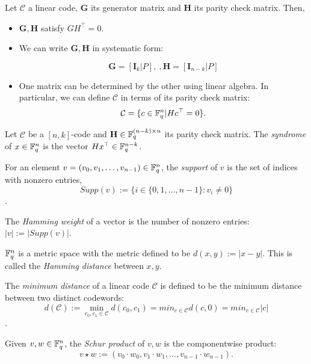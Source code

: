 \begin{remark}
Let $\mathcal{C}$ a linear code, $\mathbf{G}$ its generator matrix and $\mathbf{H}$ its parity check matrix. Then,

\begin{itemize}
\item $\mathbf{G},\mathbf{H}$ satisfy $GH^\top = 0$.
\item We can write $\mathbf{G},\mathbf{H}$ in systematic form:

\[
\mathbf{G} = [ \mathbf{I}_k | P] , \ , \mathbf{H} = [ \mathbf{I}_{n-k} | P]
\]

\item One matrix can be determined by the other using linear algebra. In particular, we can define $\mathcal{C}$ in terms of its parity check matrix: \[\mathcal{C} = \{c \in \mathbb{F}_q^n | Hc^\top = 0 \}.\]
\end{itemize}
\end{remark}

\begin{defn}
Let $\mathcal{C}$ be a $[n,k]$-code and $\mathbf{H} \in \mathbb{F}_q^{(n-k)\times n}$ its parity check matrix. The \textit{syndrome} of $x \in \mathbb{F}_q^n$ is the vector $Hx^\top \in \mathbb{F}_q^{n-k}$.

\end{defn}

\begin{defn}
For an element $v = (v_0, v_1, \ldots, v_{n-1}) \in \mathbb{F}_q^n$, the \textit{support} of $v$ is the set of indices with nonzero entries, \[Supp(v) := \{ i \in \{ 0, 1, \ldots, n-1 \} : v_i \neq 0 \}\].

The \textit{Hamming weight} of a vector is the number of nonzero entries: $|v| := | Supp(v) |$.
\end{defn}

\begin{defn}
$\mathbb{F}_q^n$ is a metric space with the metric defined to be $d(x,y) := | x - y |$. This is called the \textit{Hamming distance} between $x,y$.
\end{defn}

\begin{defn}
The \textit{minimum distance} of a linear code $\mathcal{C}$ is defined to be the minimum distance between two distinct codewords: \[d(\mathcal{C}) := \min_{c_0, c_1 \in \mathcal{C}} d(c_0,c_1) = min_{c \in \mathcal{C}} d(c,0) = min_{c \in \mathcal{C}} |c|\].
\end{defn}

\begin{defn}
Given $v, w \in \mathbb{F}_q^n$, the \textit{Schur product} of $v,w$ is the componentwise product: \[v \star w:= (v_0 \cdot w_0, v_1 \cdot w_1, \ldots , v_{n-1} \cdot w_{n-1}).\]
\end{defn}

